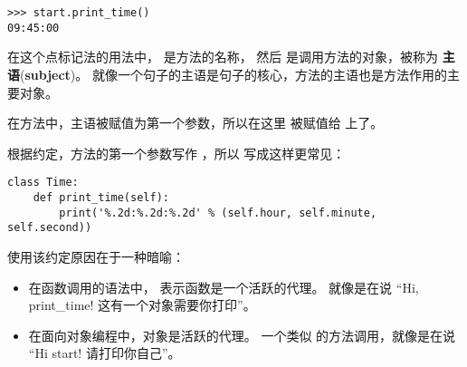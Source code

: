 \begin{lstlisting}
>>> start.print_time()
09:45:00
\end{lstlisting}

在这个点标记法的用法中， 是方法的名称，
然后  是调用方法的对象，被称为 {\bf 主语}({\bf subject})。  
就像一个句子的主语是句子的核心，方法的主语也是方法作用的主要对象。

在方法中，主语被赋值为第一个参数，所以在这里  被赋值给  上了。
  


根据约定，方法的第一个参数写作  ，所以  写成这样更常见：

\begin{lstlisting}
class Time:
    def print_time(self):
        print('%.2d:%.2d:%.2d' % (self.hour, self.minute, self.second))
\end{lstlisting}

%
使用该约定原因在于一种暗喻：


\begin{itemize}

\item 在函数调用的语法中， 表示函数是一个活跃的代理。  
就像是在说 ``Hi, print\_time! 这有一个对象需要你打印''。

\item 在面向对象编程中，对象是活跃的代理。  一个类似  的方法调用，就像是在说 ``Hi start! 请打印你自己''。

\end{itemize}

